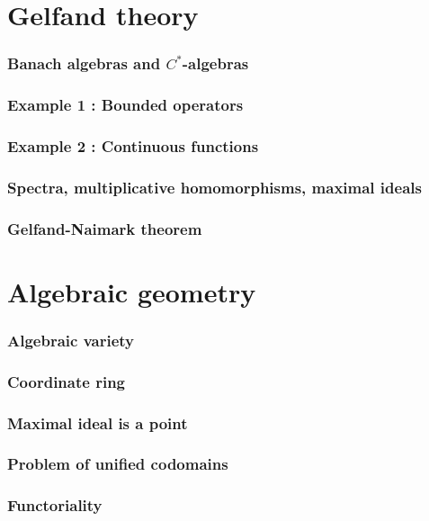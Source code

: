 \documentclass{beamer}
\begin{document}
\section{Gelfand theory}
\begin{frame}
\frametitle{Banach algebras and $C^*$-algebras}
\end{frame}
\begin{frame}
\frametitle{Example 1 : Bounded operators}
\end{frame}
\begin{frame}
\frametitle{Example 2 : Continuous functions}
\end{frame}
\begin{frame}
\frametitle{Spectra, multiplicative homomorphisms, maximal ideals}
\end{frame}
\begin{frame}
\frametitle{Gelfand-Naimark theorem}
\end{frame}


\section{Algebraic geometry}
\begin{frame}
\frametitle{Algebraic variety}
\end{frame}
\begin{frame}
\frametitle{Coordinate ring}
\end{frame}
\begin{frame}
\frametitle{Maximal ideal is a point}
\end{frame}
\begin{frame}
\frametitle{Problem of unified codomains}
\end{frame}
\begin{frame}
\frametitle{Functoriality}
\end{frame}
\end{document}
